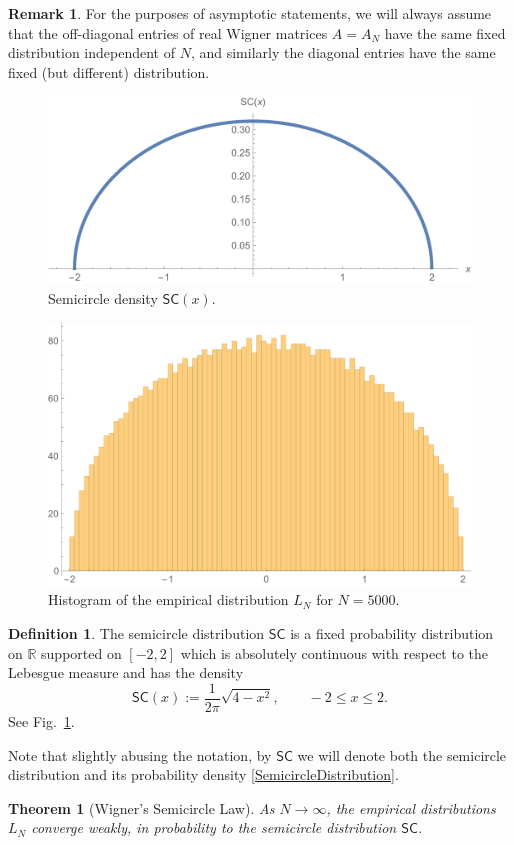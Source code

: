 \documentclass[letterpaper,11pt,oneside,reqno]{amsart}
\numberwithin{equation}{section}
\newcommand{\SC}{\mathsf{SC}}
\newtheorem{theorem}[proposition]{Theorem}
\theoremstyle{definition}
\newtheorem{definition}[proposition]{Definition}
\newtheorem{remark}[proposition]{Remark}
\begin{document}
\begin{remark}
	For the purposes of asymptotic statements, we will always assume that the 
	off-diagonal entries of real Wigner matrices 
	$A=A_N$ have the same fixed distribution independent of $N$,
	and similarly the diagonal entries 
	have the same fixed (but different) distribution.
\end{remark}

\begin{figure}[htbp]
	\includegraphics[width=.5\textwidth]{img/SC.pdf}
	\caption{Semicircle density $\SC(x)$.}
	\label{fig:semicircle}
\end{figure}

\begin{figure}[htbp]
	\includegraphics[width=.5\textwidth]{img/Wigner1.pdf}
	\caption{Histogram of the empirical distribution 
	$L_N$ for $N=5000$.}
	\label{fig:Wigner}
\end{figure}

\begin{definition}
	The semicircle distribution $\SC$ is 
	a fixed probability distribution on $\mathbb{R}$
	supported on $[-2,2]$
	which is absolutely continuous with respect to the
	Lebesgue measure and has the density
	\begin{equation}\label{SemicircleDistribution}
		\SC(x):=\frac{1}{2\pi}\sqrt{4-x^2}, \qquad -2\leq x\leq 2.
	\end{equation}
	See Fig.~\ref{fig:semicircle}.

	Note that slightly abusing the notation, by $\SC$ we will denote both the
	semicircle distribution and its probability density \eqref{SemicircleDistribution}.
\end{definition}

\begin{theorem}[Wigner's Semicircle Law]\label{thm:SemicircleLaw}
	As $N\to\infty$,
	the empirical distributions 
	$L_N$ converge weakly, in probability to the 
	semicircle distribution $\SC$.
\end{theorem}
\end{document}
